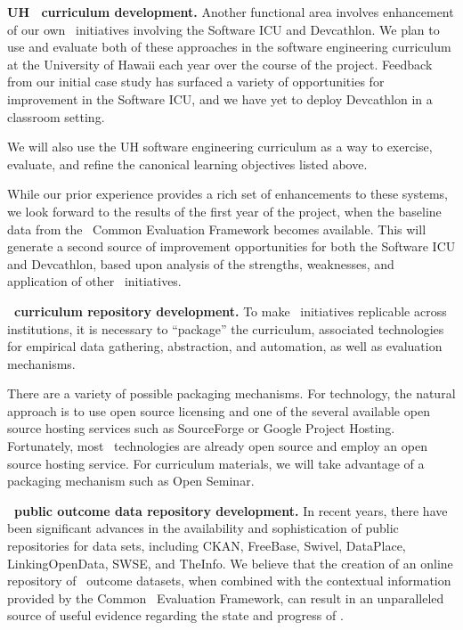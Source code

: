 {\bf UH \eCT\ curriculum development.}  Another functional area involves
enhancement of our own \eCT\ initiatives involving the Software ICU and
Devcathlon. We plan to use and evaluate both of these approaches in the
software engineering curriculum at the University of Hawaii each year over
the course of the project.  Feedback from our initial case study
\citep{csdl2-09-02,csdl2-09-03} has surfaced a variety of opportunities for
improvement in the Software ICU, and we have yet to deploy Devcathlon in a
classroom setting.

We will also use the UH software engineering curriculum as a way to exercise,
evaluate, and refine the canonical learning objectives listed above.  

While our prior experience provides a rich set of enhancements to these
systems, we look forward to the results of the first year of the project,
when the baseline data from the \eCT\ Common Evaluation Framework becomes
available.  This will generate a second source of improvement opportunities
for both the Software ICU and Devcathlon, based upon analysis of the
strengths, weaknesses, and application of other \eCT\ initiatives. 

{\bf \eCT\ curriculum repository development.}  To make \eCT\ initiatives
replicable across institutions, it is necessary to ``package'' the
curriculum, associated technologies for empirical data gathering,
abstraction, and automation, as well as evaluation mechanisms.  

There are a variety of possible packaging mechanisms.  For technology, the 
natural approach is to use open source licensing and one of the several
available open source hosting services such as SourceForge or Google Project
Hosting.  Fortunately, most \eCT\ technologies are already open source and
employ an open source hosting service.  For curriculum materials, we will 
take advantage of a packaging mechanism such as Open Seminar. 

{\bf \eCT\ public outcome data repository development.}  In recent years,
there have been significant advances in the availability and sophistication
of public repositories for data sets, including CKAN, FreeBase, Swivel,
DataPlace, LinkingOpenData, SWSE, and TheInfo.  We believe that the
creation of an online repository of \eCT\ outcome datasets, when combined
with the contextual information provided by the Common \eCT\ Evaluation
Framework, can result in an unparalleled source of useful evidence
regarding the state and progress of \eCT.  

